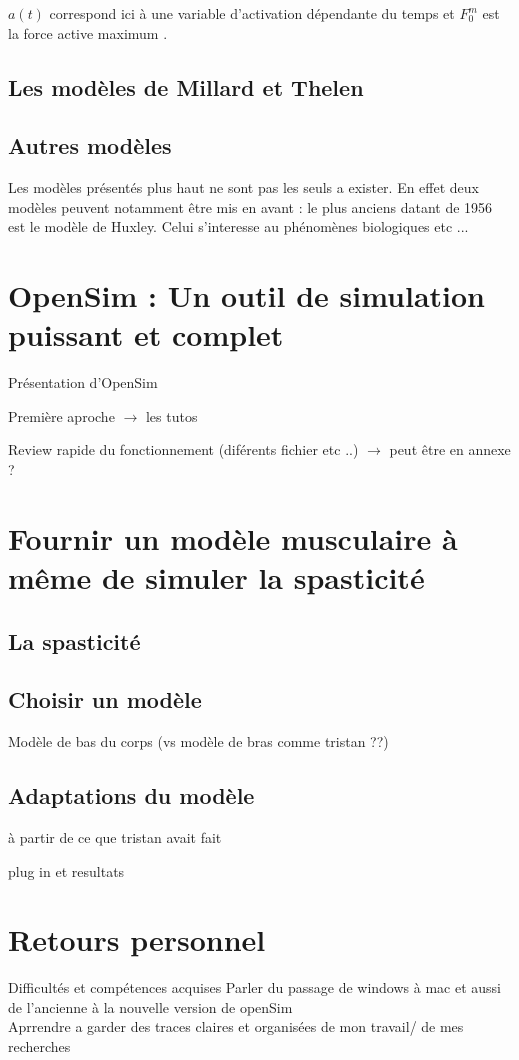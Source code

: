 $a(t)$ correspond ici à une variable d'activation dépendante du temps et $F_0^m$ est la force active maximum \cite{noauthor_millard_nodate}.

\section{Les modèles de Millard et Thelen}

\section{Autres modèles}
Les modèles présentés plus haut ne sont pas les seuls a exister. En effet deux modèles peuvent notamment être mis en avant : le plus anciens datant de 1956 est le modèle de Huxley. Celui s'interesse au phénomènes biologiques etc ... \cite{huxley_muscle_1957}
\chapter{OpenSim : Un outil de simulation puissant et complet}

Présentation d'OpenSim 

Première aproche $\rightarrow$ les tutos

Review rapide du fonctionnement (diférents fichier etc ..) $\rightarrow$ peut être en annexe ? 
\chapter{Fournir un modèle musculaire à même de simuler la spasticité}
\section{La spasticité}
\section{Choisir un modèle}
Modèle de bas du corps (vs modèle de bras comme tristan ??)
\section{Adaptations du modèle}
à partir de ce que tristan avait fait 

plug in et resultats 
\chapter{Retours personnel}
Difficultés et compétences acquises 
Parler du passage de windows à mac et aussi de l'ancienne à la nouvelle version de openSim \\

Aprrendre a garder des traces claires et organisées de mon travail/ de mes recherches 